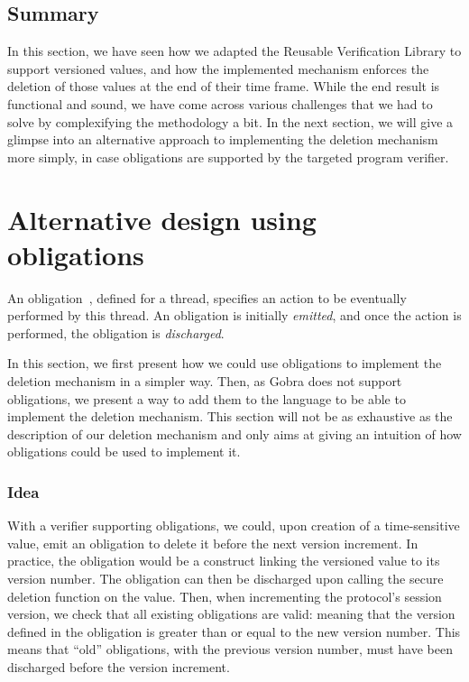 \subsection*{Summary}
In this section, we have seen how we adapted the Reusable Verification Library to support versioned values, and how the implemented mechanism enforces the deletion of those values at the end of their time frame.
While the end result is functional and sound, we have come across various challenges that we had to solve by complexifying the methodology a bit.
In the next section, we will give a glimpse into an alternative approach to implementing the deletion mechanism more simply, in case obligations are supported by the targeted program verifier.

\section{Alternative design using obligations}
\label{sec:alternative-design-using-obligations}

An obligation~\cite{bostrom2014modular}, defined for a thread, specifies an action to be eventually performed by this thread. An obligation is initially \emph{emitted}, and once the action is performed, the obligation is \emph{discharged}.

In this section, we first present how we could use obligations to implement the deletion mechanism in a simpler way.
Then, as Gobra does not support obligations, we present a way to add them to the language to be able to implement the deletion mechanism.
This section will not be as exhaustive as the description of our deletion mechanism and only aims at giving an intuition of how obligations could be used to implement it.

\subsubsection{Idea}
\label{sec:obligations-idea}

With a verifier supporting obligations, we could, upon creation of a time-sensitive value, emit an obligation to delete it before the next version increment. 
In practice, the obligation would be a construct linking the versioned value to its version number.
The obligation can then be discharged upon calling the secure deletion function on the value.
Then, when incrementing the protocol's session version, we check that all existing obligations are valid: meaning that the version defined in the obligation is greater than or equal to the new version number.
This means that “old” obligations, with the previous version number, must have been discharged before the version increment.

